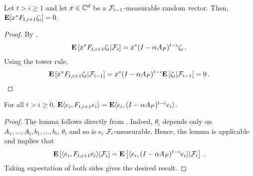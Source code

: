 \begin{lemma}\label{noisecancel}
Let $t>i\ge 1$ and let $x\in \mathbb{C}^d$ be a $\mathcal{F}_{i-1}$-measurable random vector. Then,
$\mathbf{E}[x^* F_{t,i+1}\zeta_{i}]=0$.
\end{lemma}
\begin{proof}
By ,
\begin{align*}
\mathbf{E}\left[x^* F_{t,i+1} \zeta_i | \mathcal{F}_{i} \right]  = x^* (I-\alpha A_P)^{t-i} \zeta_i\,.
\end{align*}
Using the tower rule,
\begin{align*}
\mathbf{E}\left[x^* F_{t,i+1} \zeta_i | \mathcal{F}_{i-1} \right]
= x^* (I-\alpha A_P)^{t-i}\mathbf{E}\left[ \zeta_i | \mathcal{F}_{i-1} \right]= 0\,.
\end{align*}
\end{proof}

\begin{lemma}\label{lem:unroll}
For all $t>i\ge 0$, $\mathbf{E} \langle e_i,F_{t,i+1} e_i\rangle=\mathbf{E}\langle e_i,(I-\alpha A_P)^{t-i} e_i\rangle$.
\end{lemma}
\begin{proof}
The lemma follows directly from . Indeed,
$\theta_i$ depends only on $A_1,\dots,A_{i},b_1,\dots,b_{i}$, $\theta_i$ and so is $e_i$ $\mathcal{F}_i$-measurable.
Hence, the lemma is applicable and implies that
\begin{align*}
\mathbf{E}\left[ \langle e_i, F_{t,i+1} e_i\rangle | \mathcal{F}_i \right] =
\mathbf{E}\left[ \langle e_i, (I-\alpha A_P)^{t-i} e_i\rangle | \mathcal{F}_i \right]\,.
\end{align*}
Taking expectation of both sides gives the desired result.
\end{proof}

